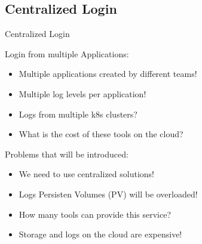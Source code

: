 \subsection{Centralized Login}\label{subsec:minimal-requirements-centralized-login}
\begin{frame}{Centralized Login}
	\begin{alertblock}{Login from multiple Applications:}
		\begin{itemize}
			\item<1-| alert@1> Multiple applications created by \alert{different} teams!
			\item<2-| alert@2> Multiple log \alert{levels} per application!
			\item<3-| alert@3> Logs from \alert{multiple} k8s clusters?
			\item<4-| alert@4> What is the cost of these tools on the cloud?
		\end{itemize}	
	\end{alertblock}
	\begin{exampleblock}{Problems that will be introduced:}
		\begin{itemize}
			\item<1-| alert@1> We need to use \alert{centralized solutions}!
			\item<2-| alert@2> Logs Persisten Volumes (PV) will be \alert{overloaded}!
			\item<3-| alert@3> How many tools can \alert{provide} this service?
			\item<4-| alert@4> \alert{Storage and logs} on the cloud are expensive!
		\end{itemize}	
	\end{exampleblock}
\end{frame}

